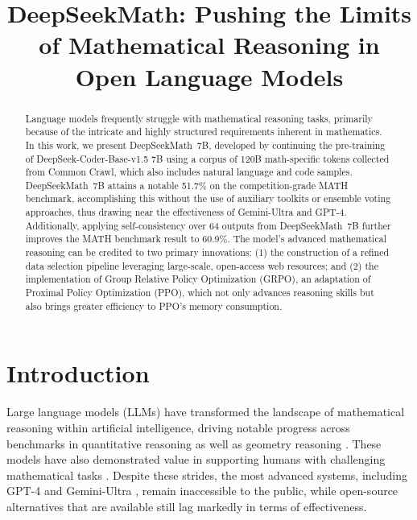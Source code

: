 \title{DeepSeekMath: Pushing the Limits of Mathematical Reasoning in Open Language Models}

\begin{abstract}
Language models frequently struggle with mathematical reasoning tasks, primarily because of the intricate and highly structured requirements inherent in mathematics. In this work, we present DeepSeekMath~7B, developed by continuing the pre-training of DeepSeek-Coder-Base-v1.5 7B using a corpus of 120B math-specific tokens collected from Common Crawl, which also includes natural language and code samples. DeepSeekMath~7B attains a notable 51.7\% on the competition-grade MATH benchmark, accomplishing this without the use of auxiliary toolkits or ensemble voting approaches, thus drawing near the effectiveness of Gemini-Ultra and GPT-4. Additionally, applying self-consistency over 64 outputs from DeepSeekMath~7B further improves the MATH benchmark result to 60.9\%. The model's advanced mathematical reasoning can be credited to two primary innovations: (1) the construction of a refined data selection pipeline leveraging large-scale, open-access web resources; and (2) the implementation of Group Relative Policy Optimization (GRPO), an adaptation of Proximal Policy Optimization (PPO), which not only advances reasoning skills but also brings greater efficiency to PPO's memory consumption.
\end{abstract}

\section{Introduction}

Large language models (LLMs) have transformed the landscape of mathematical reasoning within artificial intelligence, driving notable progress across benchmarks in quantitative reasoning \citep{MATH} as well as geometry reasoning \citep{trinh2024solving}. These models have also demonstrated value in supporting humans with challenging mathematical tasks \citep{tao}. Despite these strides, the most advanced systems, including GPT-4 \citep{gpt4} and Gemini-Ultra \citep{gemini}, remain inaccessible to the public, while open-source alternatives that are available still lag markedly in terms of effectiveness.

